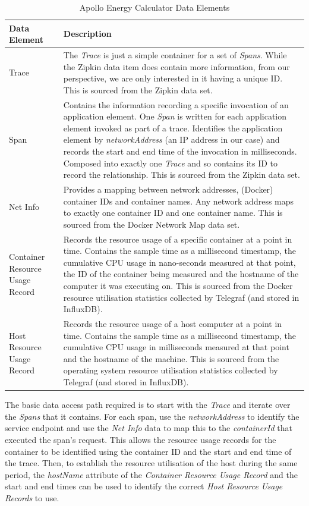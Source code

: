 \begin{table}
\centering
\caption{Apollo Energy Calculator Data Elements}
\label{table:dataelements}
\footnotesize
\begin{tabular}{|p{4cm}|p{9.5cm}|}
\hline
\textbf{Data Element} & \textbf{Description}  \\
\hline
\hline
Trace & The \textit{Trace} is just a simple container for a set of \textit{Spans}.  While the Zipkin data item does contain more information, from our perspective, we are only interested in it having a unique ID.  This is sourced from the Zipkin data set.\\
\hline
Span & Contains the information recording a specific invocation of an application element.  One \textit{Span} is written for each application element invoked as part of a trace.  Identifies the application element by \textit{networkAddress} (an IP address in our case) and records the start and end time of the invocation in milliseconds.  Composed into exactly one \textit{Trace} and so contains its ID to record the relationship.  This is sourced from the Zipkin data set. \\
\hline
Net Info & Provides a mapping between network addresses, (Docker) container IDs and container names.  Any network address maps to exactly one container ID and one container name.  This is sourced from the Docker Network Map data set. \\
\hline
Container Resource Usage Record & Records the resource usage of a specific container at a point in time.  Contains the sample time as a millisecond timestamp, the cumulative CPU usage in nano-seconds measured at that point, the ID of the container being measured and the hostname of the computer it was executing on. This is sourced from the Docker resource utilisation statistics collected by Telegraf (and stored in InfluxDB).\\
\hline
Host Resource Usage Record & Records the resource usage of a host computer at a point in time.  Contains the sample time as a millisecond timestamp, the cumulative CPU usage in milliseconds measured at that point and the hostname of the machine.  This is sourced from the operating system resource utilisation statistics collected by Telegraf (and stored in InfluxDB). \\
\hline
\end{tabular}
\end{table}

The basic data access path required is to start with the \emph{Trace} and iterate over the \emph{Spans} that it contains.  For each span, use the \emph{networkAddress} to identify the service endpoint and use the \emph{Net Info} data to map this to the \emph{containerId} that executed the span's request.  This allows the resource usage records for the container to be identified using the container ID and the start and end time of the trace.  Then, to establish the resource utilisation of the host during the same period, the \emph{hostName} attribute of the \emph{Container Resource Usage Record} and the start and end times can be used to identify the correct \emph{Host Resource Usage Records} to use.

